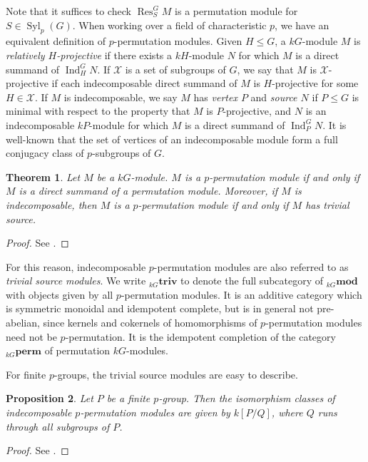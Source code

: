 \documentclass[10pt,letterpaper, boxed, cm]{amsart}
\newcommand{\Res}{\operatorname{Res}}
\newcommand{\Ind}{\operatorname{Ind}}
\newcommand{\Syl}{\operatorname{Syl}}
\newcommand{\calX}{\mathcal{X}}
\newtheorem{theorem}{Theorem}[section]
\newtheorem{prop}[theorem]{Proposition}
\theoremstyle{remark}
\theoremstyle{definition}
\begin{document}
	Note that it suffices to check $\Res^G_S M$ is a permutation module for $S \in \Syl_p(G)$. When working over a field of characteristic $p$, we have an equivalent definition of $p$-permutation modules. Given $H \leq G$, a $kG$-module $M$ is \textit{relatively $H$-projective} if there exists a $kH$-module $N$ for which $M$ is a direct summand of $\Ind^G_H N$. If $\calX$ is a set of subgroups of $G$, we say that $M$ is $\calX$-projective if each indecomposable direct summand of $M$ is $H$-projective for some $H \in \calX$. If $M$ is indecomposable, we say $M$ has \textit{vertex $P$} and \textit{source $N$} if $P \leq G$ is minimal with respect to the property that $M$ is $P$-projective, and $N$ is an indecomposable $kP$-module for which $M$ is a direct summand of $\Ind^G_P N$. It is well-known that the set of vertices of an indecomposable module form a full conjugacy class of $p$-subgroups of $G$.

	\begin{theorem}
		Let $M$ be a $kG$-module. $M$ is a $p$-permutation module if and only if $M$ is a direct summand of a permutation module. Moreover, if $M$ is indecomposable, then $M$ is a $p$-permutation module if and only if $M$ has trivial source.
	\end{theorem}
    \begin{proof}
        See \cite[Theorem 5.10.2 and Theorem 5.11.2]{L181}.
    \end{proof}

	For this reason, indecomposable $p$-permutation modules are also referred to as \textit{trivial source modules}. We write ${}_{kG}\textbf{triv}$ to denote the full subcategory of ${}_{kG}\mathbf{mod}$ with objects given by all $p$-permutation modules. It is an additive category which is symmetric monoidal and idempotent complete, but is in general not pre-abelian, since kernels and cokernels of homomorphisms of $p$-permutation modules need not be $p$-permutation. It is the idempotent completion of the category ${}_{kG}\textbf{perm}$ of permutation $kG$-modules.

	For finite $p$-groups, the trivial source modules are easy to describe.

	\begin{prop}
		Let $P$ be a finite $p$-group. Then the isomorphism classes of indecomposable $p$-permutation modules are given by $k[P/Q]$, where $Q$ runs through all subgroups of $P$.
	\end{prop}
    \begin{proof}
        See \cite[Corollary 1.11.4]{L181}.
    \end{proof}
\end{document}

